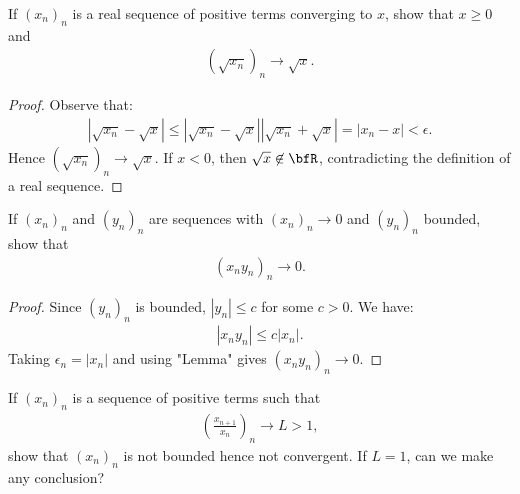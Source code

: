 \documentclass[10pt,twoside,openany]{memoir}
\begin{document}
    \begin{exercise}
        If $(x_n)_n$ is a real sequence of positive terms converging to $x$, show that $x \geq 0$ and
            \begin{equation*}
            \begin{split}
                (\sqrt{x_n})_n \rightarrow \sqrt{x}.
            \end{split}
            \end{equation*}
        
            {\color{red} \begin{proof}
                Observe that:
                    \begin{equation*}
                    \begin{split}
                        \left|\sqrt{x_n} - \sqrt{x}\right| \leq \left|\sqrt{x_n}-\sqrt{x}\right|\left|\sqrt{x_n} + \sqrt{x}\right| = \left|x_n - x\right| < \epsilon.
                    \end{split}
                    \end{equation*}
                Hence $(\sqrt{x_n})_n \rightarrow \sqrt{x}$. If $x < 0$, then $\sqrt{x} \not\in \bfR$, contradicting the definition of a real sequence.
            \end{proof}}
    \end{exercise}

    \begin{exercise}
        If $(x_n)_n$ and $(y_n)_n$ are sequences with $(x_n)_n \rightarrow 0$ and $(y_n)_n$ bounded, show that
            \begin{equation*}
            \begin{split}
                (x_n y_n)_n \rightarrow 0.
            \end{split}
            \end{equation*}
    \end{exercise}
        {\color{red} \begin{proof}
            Since $(y_n)_n$ is bounded, $|y_n| \leq c$ for some $c > 0$. We have:
                \begin{equation*}
                \begin{split}
                    |x_n y_n| \leq c|x_n|.
                \end{split}
                \end{equation*}
            Taking $\epsilon_n = |x_n|$ and using "Lemma" gives $(x_n y_n)_n \rightarrow 0$.
        \end{proof}}

    \begin{exercise}
        If $(x_n)_n$ is a sequence of positive terms such that
            \begin{equation*}
            \begin{split}
                \left(\frac{x_{n+1}}{x_n}\right)_n \rightarrow L > 1,
            \end{split}
            \end{equation*}
        show that $(x_n)_n$ is not bounded hence not convergent. If $L=1$, can we make any conclusion?
    \end{exercise}
\end{document}
